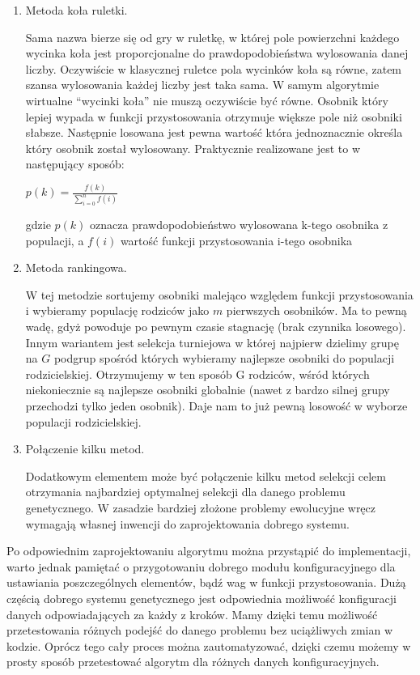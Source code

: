 \begin{par}
\begin{enumerate}
\begin{par}
\begin{enumerate}
			\item Metoda koła ruletki.
				\begin{par}
					Sama nazwa bierze się od gry w ruletkę, w której pole powierzchni każdego wycinka koła jest proporcjonalne do prawdopodobieństwa wylosowania danej liczby. 
					Oczywiście w klasycznej ruletce pola wycinków koła są równe, zatem szansa wylosowania każdej liczby jest taka sama.
					W samym algorytmie wirtualne ``wycinki koła'' nie muszą oczywiście być równe. 
					Osobnik który lepiej wypada w funkcji przystosowania otrzymuje większe pole niż osobniki słabsze. 
					Następnie losowana jest pewna wartość która jednoznacznie określa który osobnik został wylosowany.
					Praktycznie realizowane jest to w następujący sposób:
					\begin{center}
						$p(k)=\frac{f(k)}{\displaystyle\sum\limits_{i=0}^n f(i)}$
					\end{center}
					gdzie $p(k)$ oznacza prawdopodobieństwo wylosowana k-tego osobnika z populacji, a $f(i)$ wartość funkcji przystosowania i-tego osobnika
				\end{par}
			\item Metoda rankingowa.
				\begin{par}
					W tej metodzie sortujemy osobniki malejąco względem funkcji przystosowania i wybieramy populację rodziców jako $m$ pierwszych osobników. 
					Ma to pewną wadę, gdyż powoduje po pewnym czasie stagnację (brak czynnika losowego). 
					Innym wariantem jest selekcja turniejowa w której najpierw dzielimy grupę na $G$ podgrup spośród których wybieramy najlepsze osobniki do populacji rodzicielskiej. 
					Otrzymujemy w ten sposób G rodziców, wśród których niekoniecznie są najlepsze osobniki globalnie (nawet z bardzo silnej grupy przechodzi tylko jeden osobnik). 
					Daje nam to już pewną losowość w wyborze populacji rodzicielskiej.
				\end{par}
			\item Połączenie kilku metod.
				\begin{par}
					Dodatkowym elementem może być połączenie kilku metod selekcji celem otrzymania najbardziej optymalnej selekcji dla danego problemu genetycznego. 
					W zasadzie bardziej złożone problemy ewolucyjne wręcz wymagają własnej inwencji do zaprojektowania dobrego systemu.
				\end{par}
		\end{enumerate}
	\end{par}
\end{enumerate}
	Po odpowiednim zaprojektowaniu algorytmu można przystąpić do implementacji, warto jednak pamiętać o przygotowaniu dobrego modułu konfiguracyjnego dla ustawiania poszczególnych elementów, bądź wag w funkcji przystosowania.
	Dużą częścią dobrego systemu genetycznego jest odpowiednia możliwość konfiguracji danych odpowiadających za każdy z kroków.
	Mamy dzięki temu możliwość przetestowania różnych podejść do danego problemu bez uciążliwych zmian w kodzie. 
	Oprócz tego cały proces można zautomatyzować, dzięki czemu możemy w prosty sposób przetestować algorytm dla różnych danych konfiguracyjnych.
\end{par}
